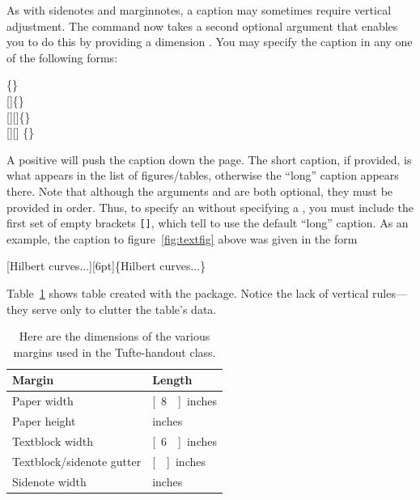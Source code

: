 As with sidenotes and marginnotes, a caption may sometimes require vertical
adjustment. The  command now takes a second optional
argument that enables you to do this by providing a dimension .
You may specify the caption in any one of the following forms:
\begin{docspec}
	\{\}\\
	[]\{\}\\
	[][]\{\}\\
	[][]%
	\{\}
\end{docspec}
A positive  will push the caption down the page. The short
caption, if provided, is what appears in the list of figures/tables, otherwise
the ``long'' caption appears there. Note that although the arguments
 and  are both optional, they must be
provided in order. Thus, to specify an  without specifying a
, you must include the first set of empty brackets
\Verb|[]|, which tell  to use the default ``long'' caption. As
an example, the caption to figure~\ref{fig:textfig} above was given in the form
\begin{docspec}
	[Hilbert curves...][6pt]\{Hilbert curves...\}
\end{docspec}

Table~\ref{tab:normaltab} shows table created with the 
package.  Notice the lack of vertical rules---they serve only to clutter
the table's data.

\begin{table}[ht]
	\centering
	\selectfont
	\begin{tabular}{ll}
		\toprule
		Margin & Length \\
		\midrule
		Paper width & \unit[8\nicefrac{1}{2}]{inches} \\
		Paper height & \unit[11]{inches} \\
		Textblock width & \unit[6\nicefrac{1}{2}]{inches} \\
		Textblock/sidenote gutter & \unit[\nicefrac{3}{8}]{inches} \\
		Sidenote width & \unit[2]{inches} \\
		\bottomrule
	\end{tabular}
	\caption{Here are the dimensions of the various margins used in the Tufte-handout class.}
	\label{tab:normaltab}
\end{table}

